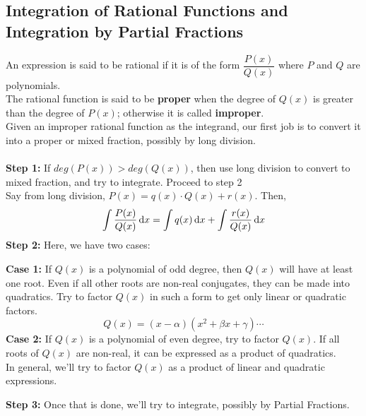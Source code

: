 \documentclass[14]{article}
\theoremstyle{definition}
\theoremstyle{case}
\begin{document}
\subsection{Integration of Rational Functions and Integration by Partial Fractions}
An expression is said to be rational if it is of the form $\dfrac{P(x)}{Q(x)}$ where $P$ and $Q$ are polynomials.\\
The rational function is said to be \textbf{proper} when the degree of $Q(x)$ is greater than the degree of $P(x)$; otherwise it is called \textbf{improper}.\\
Given an improper rational function as the integrand, our first job is to convert it into a proper or mixed fraction, possibly by long division.\\\\
\textbf{Step 1:} If $deg(P(x)) > deg(Q(x))$, then use long division to convert to mixed fraction, and try to integrate. Proceed to step 2\\
Say from long division, $P(x) = q(x) \cdot Q(x) + r(x)$.
Then,
\[\int \dfrac{P(x)}{Q(x)} \dif x = \int q(x) \dif x + \int \dfrac{r(x)}{Q(x)} \dif x\]
\textbf{Step 2:} Here, we have two cases:\\
\begin{addmargin}[3em]{1em}%
\textbf{Case 1:} If $Q(x)$ is a polynomial of odd degree, then $Q(x)$ will have at least one root. Even if all other roots are non-real conjugates, they can be made into quadratics. Try to factor $Q(x)$ in such a form to get only linear or quadratic factors.\\
\[Q(x) = (x-\alpha)(x^2 + \beta x + \gamma)\cdots\]
\textbf{Case 2:} If $Q(x)$ is a polynomial of even degree, try to factor $Q(x)$. If all roots of $Q(x)$ are non-real, it can be expressed as a product of quadratics.\\
In general, we'll try to factor $Q(x)$ as a product of linear and quadratic expressions.\\
\end{addmargin}
\textbf{Step 3:} Once that is done, we'll try to integrate, possibly by Partial Fractions.\\
\end{document}
